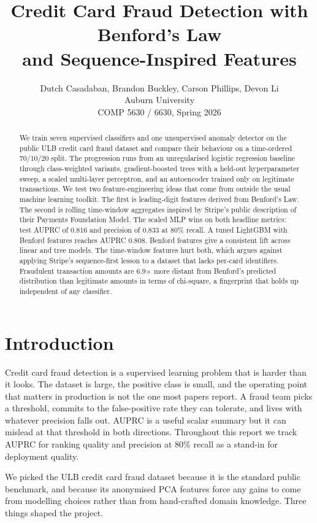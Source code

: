 \documentclass{article}
\title{Credit Card Fraud Detection with Benford's Law\\and Sequence-Inspired Features}
\author{%
  Dutch Casadaban, Brandon Buckley, Carson Phillips, Devon Li\\
  Auburn University\\
  COMP 5630 / 6630, Spring 2026
}
\begin{document}
\maketitle

\begin{abstract}
We train seven supervised classifiers and one unsupervised anomaly detector on the public ULB credit card fraud dataset and compare their behaviour on a time-ordered 70/10/20 split. The progression runs from an unregularised logistic regression baseline through class-weighted variants, gradient-boosted trees with a held-out hyperparameter sweep, a scaled multi-layer perceptron, and an autoencoder trained only on legitimate transactions. We test two feature-engineering ideas that come from outside the usual machine learning toolkit. The first is leading-digit features derived from Benford's Law. The second is rolling time-window aggregates inspired by Stripe's public description of their Payments Foundation Model. The scaled MLP wins on both headline metrics: test AUPRC of 0.816 and precision of 0.833 at 80\% recall. A tuned LightGBM with Benford features reaches AUPRC 0.808. Benford features give a consistent lift across linear and tree models. The time-window features hurt both, which argues against applying Stripe's sequence-first lesson to a dataset that lacks per-card identifiers. Fraudulent transaction amounts are 6.9$\times$ more distant from Benford's predicted distribution than legitimate amounts in terms of chi-square, a fingerprint that holds up independent of any classifier.
\end{abstract}

\section{Introduction}

Credit card fraud detection is a supervised learning problem that is harder than it looks. The dataset is large, the positive class is small, and the operating point that matters in production is not the one most papers report. A fraud team picks a threshold, commits to the false-positive rate they can tolerate, and lives with whatever precision falls out. AUPRC is a useful scalar summary but it can mislead at that threshold in both directions. Throughout this report we track AUPRC for ranking quality and precision at 80\% recall as a stand-in for deployment quality.

We picked the ULB credit card fraud dataset \cite{dalpozzolo2018} because it is the standard public benchmark, and because its anonymised PCA features force any gains to come from modelling choices rather than from hand-crafted domain knowledge. Three things shaped the project.
\end{document}

